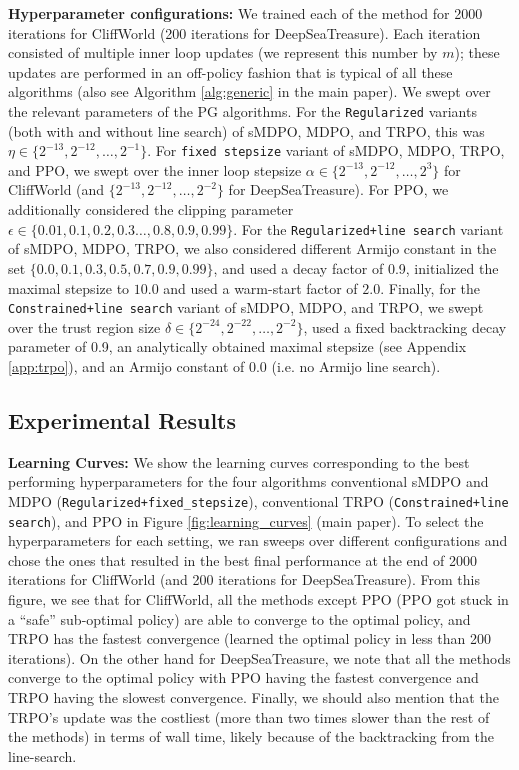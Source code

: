 \documentclass[a4paper, 10pt]{article}
\begin{document}
\textbf{Hyperparameter configurations:} We trained each of the method for 2000 iterations for CliffWorld (200 iterations for DeepSeaTreasure). Each iteration consisted of multiple inner loop updates (we represent this number by $m$); these updates are performed in an off-policy fashion that is typical of all these algorithms (also see Algorithm \ref{alg:generic} in the main paper). We swept over the relevant parameters of the PG algorithms. For the \texttt{Regularized} variants (both with and without line search) of sMDPO, MDPO, and TRPO, this was $\eta \in \{2^{-13}, 2^{-12}, \ldots, 2^{-1}\}$. For \texttt{fixed stepsize} variant of  sMDPO, MDPO, TRPO, and PPO, we swept over the inner loop stepsize $\alpha \in \{2^{-13}, 2^{-12}, \ldots, 2^3\}$ for CliffWorld (and $\{2^{-13}, 2^{-12}, \ldots, 2^{-2}\}$ for DeepSeaTreasure). For PPO, we additionally considered the clipping parameter $\epsilon \in \{0.01, 0.1, 0.2, 0.3 \ldots, 0.8, 0.9, 0.99\}$. For the \texttt{Regularized+line search} variant of  sMDPO, MDPO, TRPO, we also considered different Armijo constant in the set $\{0.0, 0.1, 0.3, 0.5, 0.7, 0.9, 0.99\}$, and used a decay factor of 0.9, initialized the maximal stepsize to $10.0$ and used a warm-start factor of $2.0$. Finally, for the \texttt{Constrained+line search} variant of  sMDPO, MDPO, and TRPO, we swept over the trust region size $\delta \in \{2^{-24}, 2^{-22}, \ldots, 2^{-2}\}$, used a fixed backtracking decay parameter of 0.9, an analytically obtained maximal stepsize (see Appendix \ref{app:trpo}), and an Armijo constant of 0.0 (i.e. no Armijo line search).

\subsection{Experimental Results}
\textbf{Learning Curves:} We show the learning curves corresponding to the best performing hyperparameters for the four algorithms conventional sMDPO and MDPO (\texttt{Regularized+fixed_stepsize}), conventional TRPO (\texttt{Constrained+line search}), and PPO in Figure \ref{fig:learning_curves} (main paper). To select the hyperparameters for each setting, we ran sweeps over different configurations and chose the ones that resulted in the best final performance at the end of 2000 iterations for CliffWorld (and 200 iterations for DeepSeaTreasure). From this figure, we see that for CliffWorld, all the methods except PPO (PPO got stuck in a ``safe'' sub-optimal policy) are able to converge to the optimal policy, and TRPO has the fastest convergence (learned the optimal policy in less than 200 iterations). On the other hand for DeepSeaTreasure, we note that all the methods converge to the optimal policy with PPO having the fastest convergence and TRPO having the slowest convergence. Finally, we should also mention that the TRPO's update was the costliest (more than two times slower than the rest of the methods) in terms of wall time, likely because of the backtracking from the line-search. 
\end{document}
